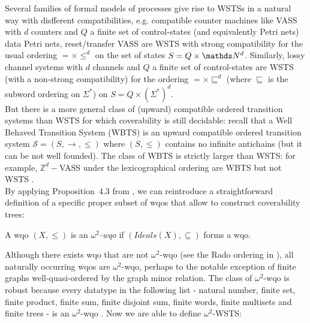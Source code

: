 \documentclass[runningheads]{llncs}
\begin{document}
Several families of formal models of processes  \cite{DBLP:journals/tcs/FinkelS01} give rise to WSTSs in a natural way with disfferent compatibilities, e.g. compatible counter machines like VASS with $d$ counters and $Q$ a finite set of control-states (and equivalently Petri nets) data Petri nets\nocite{DBLP:journals/fuin/LazicNORW08}, reset/transfer VASS are WSTS with strong compatibility for the usual ordering $=\times \leq^d$ on the set of states $S=Q \times \N^d$.
Similarly, lossy channel systems with $d$ channels and $Q$ a finite set of control-states are WSTS (with a non-strong compatibility)
for the ordering $=\times \sqsubseteq^d$ (where $\sqsubseteq$ is the subword ordering on $\Sigma^*$) on $S= Q \times (\Sigma^*)^d$.\\

But there is a more general class of (upward) compatible ordered transition systems than WSTS for which coverability is still decidable: recall that a Well Behaved Transition System (WBTS) \cite{DBLP:journals/lmcs/BlondinFM17} is an upward compatible ordered transition system $\mathscr{S}=(S, \rightarrow, \leq)$ where $(S,\leq)$ contains no infinite antichains (but it can be not well founded). The class of WBTS is strictly larger than WSTS: for example, $\mathbb{Z}^d-$VASS under the lexicographical ordering are WBTS but not WSTS \cite{DBLP:journals/lmcs/BlondinFM17}. \\

By applying Proposition~4.3 from \cite{DBLP:journals/corr/abs-1208-4549}, we can reintroduce a straightforward definition of a specific proper subset of wqos that allow to construct coverability trees: 

\begin{definition}
A wqo $(X, \leq)$ is an \emph{$\omega^2$-wqo} if $(Ideals(X), \subseteq)$ forms a wqo.
\end{definition}


Although there exists wqo that are not $\omega^2$-wqo (see the Rado ordering in \cite{DBLP:journals/ipl/Jancar99}), all naturally occurring wqos are $\omega^2$-wqo, perhaps to the notable exception of ﬁnite graphs well-quasi-ordered by the graph minor relation. %
The class of $\omega^2$-wqo is robust because every datatype in the following list - natural number, finite set, ﬁnite product, ﬁnite sum, finite disjoint sum, ﬁnite words, ﬁnite multisets and ﬁnite trees - is an $\omega^2$-wqo \cite[Proposition~4.5]{DBLP:journals/corr/abs-1208-4549}. Now we are able to define $\omega^2$-WSTS:
\end{document}
